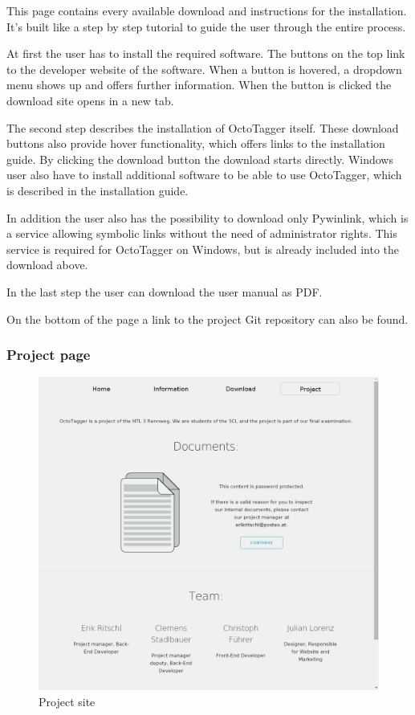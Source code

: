 This page contains every available download and instructions for the installation. It's built like a step by step tutorial to guide the user through the entire process.

At first the user has to install the required software. The buttons on the top link to the developer website of the software. When a button is hovered, a dropdown menu shows up and offers further information. When the button is clicked the download site opens in a new tab.
 
The second step describes the installation of OctoTagger itself. These download buttons also provide hover functionality, which offers links to the installation guide. By clicking the download button the download starts directly. Windows user also have to install additional software to be able to use OctoTagger, which is described in the installation guide. 

In addition the user also has the possibility to download only Pywinlink, which is a service allowing symbolic links without the need of administrator rights. This service is required for OctoTagger on Windows, but is already included into the download above.

In the last step the user can download the user manual as PDF.

On the bottom of the page a link to the project Git repository can also be found.

\subsubsection{Project page}

\begin{figure}
\centering
\includegraphics[scale=0.35]{images/project_full.png}
\caption{Project site}
\end{figure}

